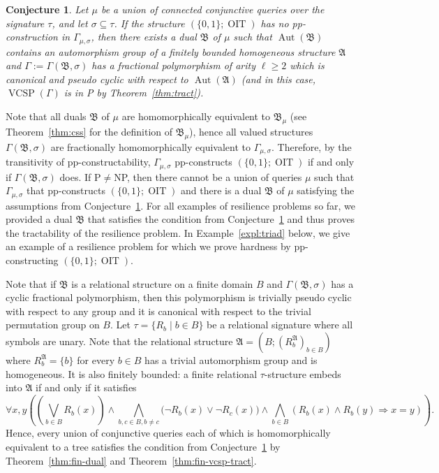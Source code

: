 \documentclass[nonacm]{acmart}
\newcommand{\bA}{{\mathfrak A}}
\newcommand{\bB}{{\mathfrak B}}
\DeclareMathOperator{\Aut}{Aut}
\DeclareMathOperator{\VCSP}{VCSP}
\DeclareMathOperator{\OIT}{OIT}
\newtheorem{conjecture}[theorem]{Conjecture}
\begin{document}
\begin{conjecture}\label{conj:tract}
Let $\mu$ be a union of connected conjunctive queries over the signature $\tau$, and let $\sigma \subseteq \tau$. If the structure $(\{0,1\};\OIT)$ 
has no pp-construction in $\Gamma_{\mu,\sigma}$,
then there exists a dual $\bB$ of $\mu$ such that $\Aut(\bB)$ contains an automorphism group of a finitely bounded homogeneous structure $\bA$ and 
$\Gamma := \Gamma(\bB, \sigma)$
has a fractional polymorphism of arity $\ell \geq 2$ which is canonical and pseudo cyclic with respect to $\Aut(\bA)$ 
(and in this case, $\VCSP(\Gamma)$ is in P by Theorem~\ref{thm:tract}). 
\end{conjecture}
Note that all duals $\bB$ of $\mu$ are homomorphically equivalent to $\bB_\mu$ (see Theorem~\ref{thm:css} for the definition of $\bB_\mu$), hence all valued structures $\Gamma(\bB, \sigma)$ are fractionally homomorphically equivalent to $\Gamma_{\mu,\sigma}$. Therefore, by the transitivity of pp-constructability,  $\Gamma_{\mu,\sigma}$ pp-constructs $(\{0,1\};\OIT)$ if and only if $\Gamma(\bB, \sigma)$ does. If P$\neq$NP, then there cannot be a union of queries $\mu$ such that $\Gamma_{\mu,\sigma}$ that pp-constructs $(\{0,1\};\OIT)$ and there is a dual $\bB$ of $\mu$ satisfying the assumptions from Conjecture~\ref{conj:tract}.
For all examples of resilience problems so far, we provided a dual $\bB$ that satisfies the condition from Conjecture~\ref{conj:tract} and thus proves the tractability of the resilience problem. In Example~\ref{expl:triad} below, we give an example of a resilience problem for which we prove hardness by pp-constructing $(\{0,1\};\OIT)$. 

Note that if $\bB$ is a relational structure on a finite domain $B$ and $\Gamma(\bB, \sigma)$ has a cyclic fractional polymorphism, then this polymorphism is trivially pseudo cyclic with respect to any group and it is canonical with respect to the trivial permutation group on $B$.  Let $\tau = \{R_b \mid b \in B\}$ be a relational signature where all symbols are unary. Note that the relational structure $\bA=(B; (R_b^{\bA})_{b \in B})$ where $R_b^{\bA} = \{b\}$ for every $b \in B$ has a trivial automorphism group and is homogeneous. It is also finitely bounded: a finite relational $\tau$-structure embeds into $\bA$ if and only if it satisfies
\[\forall x,y \left( \left( \bigvee_{b \in B} R_b(x) \right) \wedge \bigwedge_{b, c \in B, b \neq c} \big(\neg R_b(x) \vee \neg R_c (x) \big)  \wedge \bigwedge_{b \in B} (R_b(x) \wedge R_b(y) \Rightarrow x=y) \right).\]
Hence, every union of conjunctive queries each of which is homomorphically equivalent to a tree satisfies the condition from Conjecture~\ref{conj:tract} by Theorem~\ref{thm:fin-dual} and Theorem~\ref{thm:fin-vcsp-tract}.
\end{document}
